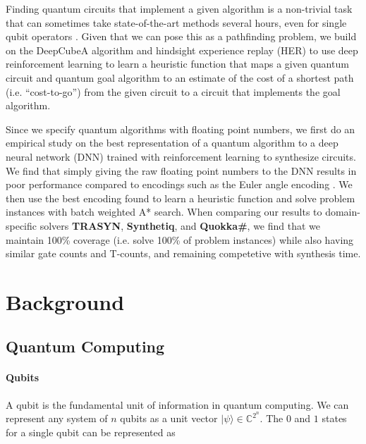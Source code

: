 \documentclass[letterpaper]{article} %
\begin{document}
Finding quantum circuits that implement a given algorithm is a non-trivial task that can sometimes take state-of-the-art methods several hours, even for single qubit operators \cite{paradis2024Synthetiq}.
Given that we can pose this as a pathfinding problem, we build on the DeepCubeA algorithm \cite{agostinelli2019solving}
and hindsight experience replay (HER) \cite{andrychowicz2017hindsight} to use deep reinforcement learning to learn
a heuristic function that maps a given quantum circuit and quantum goal algorithm to an estimate of the cost of a
shortest path (i.e. ``cost-to-go'') from the given circuit to a circuit that implements the goal algorithm.

Since we specify quantum algorithms with floating point numbers, we first do an empirical study on the best representation of a quantum algorithm to a deep neural network (DNN) \cite{schmidhuber2015deep, lecun2015deep} trained with reinforcement learning to synthesize circuits. We find that simply giving the raw floating point numbers to the DNN results in poor performance compared to encodings such as the Euler angle encoding \cite{diaconis2017hurwitz}.
We then use the best encoding found to learn a heuristic function and solve problem instances with batch weighted A* search.
When comparing our results to domain-specific solvers \textbf{TRASYN}, \textbf{Synthetiq}, and \textbf{Quokka\#}, we find that we maintain 100\% coverage (i.e. solve 100\% of problem instances) while also having similar gate counts and T-counts, and remaining competetive with synthesis time.



\section{Background}


\subsection{Quantum Computing}


\paragraph{Qubits}

A qubit is the fundamental unit of information in quantum computing.
We can represent any system of $n$ qubits as a unit vector $|\psi\rangle \in \mathbb{C}^{2^n}$.
The $0$ and $1$ states for a single qubit can be represented as
\end{document}
